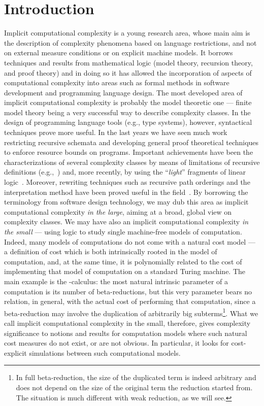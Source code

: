\documentclass{LMCS}
\newcounter{number}
\begin{document}
\section*{Introduction}
\par
Implicit computational complexity is a young research area, whose main aim is the description of complexity phenomena 
based on language restrictions, and not on external 
measure conditions or on explicit machine models. 
It borrows techniques and results from mathematical logic (model theory, recursion theory, and proof theory)
and in doing so it has allowed the
incorporation of aspects of computational complexity into areas such as formal methods in software development
and programming language design. The most developed area of implicit computational complexity is probably the
model theoretic one --- finite model theory being a very successful way to describe
complexity classes. In the design of  programming language tools (e.g., type systems), however, syntactical
techniques prove more useful. In the last years we have seen much work restricting
recursive schemata and developing general proof theoretical techniques to enforce
resource bounds on programs. 
Important achievements have been the characterizations of several complexity classes
by means of limitations of recursive definitions (e.g.,~\cite{Bellantoni92CC,Leivant95RRI}) and, more recently, by 
using the ``\emph{light}'' fragments of 
linear logic~\cite{Girard98ic}. 
Moreover, rewriting techniques such as recursive path orderings and
the interpretation method have been proved useful in the field~\cite{Marion00}.
By borrowing the terminology from software design technology, we may dub this 
area as implicit computational complexity \emph{in the large}, aiming at a broad, global view on complexity classes.
We may have also an implicit computational complexity \emph{in the small} ---
using logic to study single machine-free models of computation. Indeed, many models of computations do not come
with a natural cost model --- a definition of cost which is both intrinsically rooted in the model of 
computation, and, at the same time, it is polynomially related to the cost of implementing that
model of computation on a standard Turing machine. The main example is the -calculus: the most natural intrinsic
parameter of a computation is its number of beta-reductions, but this very parameter bears no
relation, in general, with the actual cost of performing that computation, since a beta-reduction may involve the duplication of arbitrarily big subterms\footnote{
In full beta-reduction, the size of the duplicated term is indeed arbitrary and does not depend on
the size of the original term the reduction started from. The situation is much different with weak 
reduction, as we will see.}.
What we call implicit computational complexity in the small, therefore, gives complexity significance to
notions and results for computation models where such natural cost measures do not exist, or are
not obvious. In particular, it looks for cost-explicit simulations between such computational models.
\end{document}
